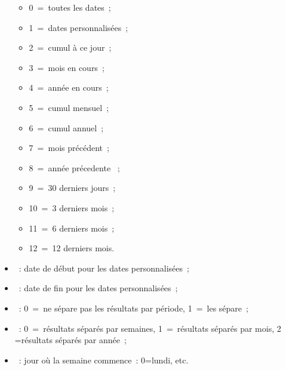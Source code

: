\begin{itemize}
	\begin{itemize}

	\item 0~=~toutes les dates~;

	\item 1~=~dates personnalisées~;

	\item 2~=~cumul à ce jour~;

	\item 3~=~mois en cours~;

	\item 4~=~année en cours~;

	\item 5~=~cumul mensuel~;

	\item 6~=~cumul annuel~;

	\item 7~=~mois précédent~;

	\item 8~=~année précedente ~;

	\item 9~=~30 derniers jours~;

	\item 10~=~3 derniers mois~;

	\item 11~=~6 derniers mois~;

	\item 12~=~12 derniers mois.

	\end{itemize} 

\item  {}~: date de début pour les dates personnalisées~;

\item  {}~: date de fin pour les dates personnalisées~;

\item  {}~: 0~=~ne sépare pas les résultats par période, 1~=~les sépare~;

\item  {}~: 0~=~résultats séparés par semaines, 1~=~résultats séparés par mois, 2 =résultats séparés par année~;

\item  {}~: jour où la semaine commence~: 0=lundi, etc.


\end{itemize}
